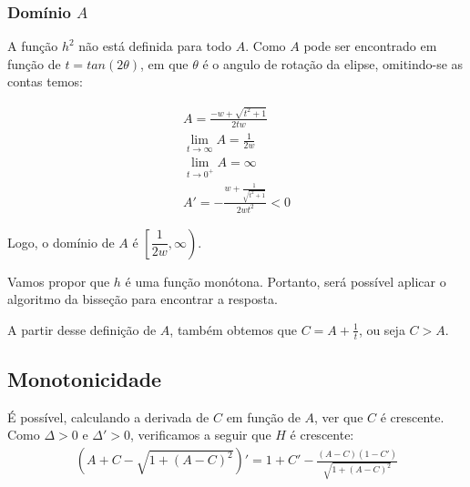 \documentclass{article}
\begin{document}
	\subsubsection{Domínio $A$}
	
	A função $h^2$ não está definida para todo $A$. Como $A$ pode ser encontrado em função de $t = tan(2\theta)$, em que $\theta$ é o angulo de rotação da elipse, omitindo-se as contas temos:
	
	\begin{align}
	A = \frac{-w + \sqrt{t^2 + 1}}{2tw}\\
	\lim\limits_{t\to \infty} A = \frac{1}{2w}\\
	\lim\limits_{t\to 0^+} A = \infty\\
	A' = -\frac{w + \frac{1}{\sqrt{t^2+1}}}{2wt^2} < 0
	\end{align}
	
	Logo, o domínio de $A$ é $\left[\dfrac{1}{2w}, \infty\right)$.
	
	Vamos propor que $h$ é uma função monótona. Portanto, será possível aplicar o algoritmo da bisseção para encontrar a resposta.
	
	A partir desse definição de $A$, também obtemos que $C = A + \frac{1}{t}$, ou seja $C > A$.
	
	\subsection{Monotonicidade}
	
	É possível, calculando a derivada de $C$ em função de $A$, ver que $C$ é crescente.
	Como $\Delta>0$ e $\Delta'>0$, verificamos a seguir que $H$ é crescente:
	\begin{align*}
	(A+C-\sqrt{1+(A-C)^2})' = 1 + C' - \frac{(A-C)(1-C')}{\sqrt{1+(A-C)^2}}
	\end{align*}
\end{document}
